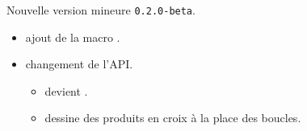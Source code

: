 Nouvelle version mineure \verb+0.2.0-beta+.

\begin{itemize}[itemsep=.5em]
    \item {}
          ajout de la macro .


    \item {} changement de l'API.
    \begin{itemize}[itemsep=.5em]
        \item {} devient .

        \item {} dessine des produits en croix à la place des boucles.
    \end{itemize}


\end{itemize}

\separation
